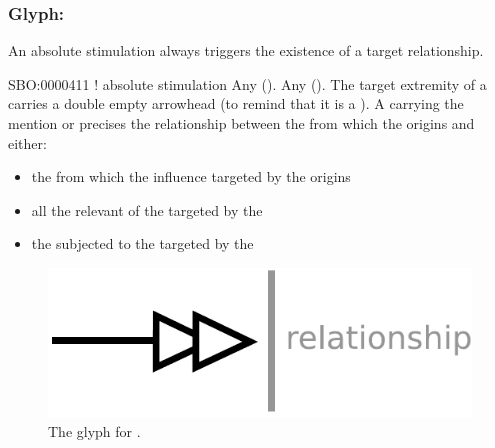 
\subsubsection{Glyph: }\label{sec:absoluteStimulation}

An absolute stimulation always triggers the existence of a target relationship. 

\begin{glyphDescription}
 \glyphSboTerm SBO:0000411 ! absolute stimulation
 \glyphOrigin Any  ().
 \glyphTarget Any  ().
 \glyphEndPoint The target extremity of a  carries a double empty arrowhead (to remind that it is a ).
 \glyphAux A  carrying the mention  or  precises the relationship between the  from which the  origins and either:
\begin{itemize}
\item the  from which the influence targeted by the  origins
\item all the relevant  of the  targeted by the 
\item the  subjected to the  targeted by the 
\end{itemize}
 \end{glyphDescription}

\begin{figure}[H]
  \centering
  \includegraphics[scale = 0.5]{images/absoluteStimulation}
  \caption{The \ER glyph for .}
  \label{fig:absoluteStimulation}
\end{figure}

